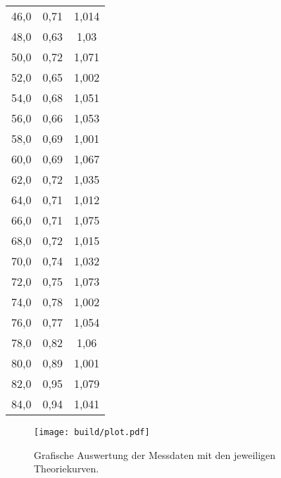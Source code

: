 \begin{table}[H]
\begin{tabular}{c c c}
        46,0  &  0,71  &  1,014  \\
        48,0  &  0,63  &  1,03  \\
        50,0  &  0,72  &  1,071  \\
        52,0  &  0,65  &  1,002  \\
        54,0  &  0,68  &  1,051  \\
        56,0  &  0,66  &  1,053  \\
        58,0  &  0,69  &  1,001  \\
        60,0  &  0,69  &  1,067  \\
        62,0  &  0,72  &  1,035  \\
        64,0  &  0,71  &  1,012  \\
        66,0  &  0,71  &  1,075  \\
        68,0  &  0,72  &  1,015  \\
        70,0  &  0,74  &  1,032  \\
        72,0  &  0,75  &  1,073  \\
        74,0  &  0,78  &  1,002  \\
        76,0  &  0,77  &  1,054  \\
        78,0  &  0,82  &  1,06  \\
        80,0  &  0,89  &  1,001  \\
        82,0  &  0,95  &  1,079  \\
        84,0  &  0,94  &  1,041  \\
        \bottomrule
    \end{tabular}
\end{table}


\begin{figure}[H]
    \centering
    \texttt{[image: build/plot.pdf]}
    \caption{Grafische Auswertung der Messdaten mit den jeweiligen Theoriekurven.}
    \label{fig:plot}
  \end{figure}